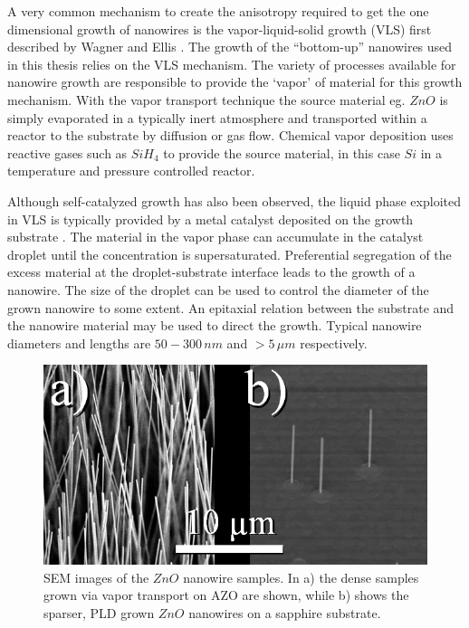 
A very common mechanism to create the anisotropy required to get the one dimensional growth of nanowires is the vapor-liquid-solid growth (VLS) first described by Wagner and Ellis \cite{wagner_vapor-liquid-solid_1964}. The growth of the ``bottom-up'' nanowires used in this thesis relies on the VLS mechanism. The variety of processes available for nanowire growth are responsible to provide the `vapor' of material for this growth mechanism. With the vapor transport technique the source material eg. $ZnO$ is simply evaporated in a typically inert atmosphere and transported within a reactor to the substrate by diffusion or gas flow. Chemical vapor deposition uses reactive gases such as $SiH_4$ to provide the source material, in this case $Si$ in a temperature and pressure controlled reactor. 


Although self-catalyzed growth has also been observed, the liquid phase exploited in VLS is typically provided by a metal catalyst deposited on the growth substrate \cite{duan_general_2000,wacaser_preferential_2009}. The material in the vapor phase can accumulate in the catalyst droplet until the concentration is supersaturated. Preferential segregation of the excess material at the droplet-substrate interface leads to the growth of a nanowire. The size of the droplet can be used to control the diameter of the grown nanowire to some extent. An epitaxial relation between the substrate and the nanowire material may be used to direct the growth. Typical nanowire diameters and lengths are $50 - 300\,nm$ and $> 5\,\mu m$ respectively. 

\begin{figure}
	\centering
		\includegraphics[width=.5\textwidth]{images/ZnOnanowires.jpg}
	\caption{SEM images of the $ZnO$ nanowire samples. In a) the dense samples grown via vapor transport on AZO are shown, while b) shows the sparser, PLD grown $ZnO$ nanowires on a sapphire substrate.}
	\label{ZnOnanowires}
\end{figure} 


